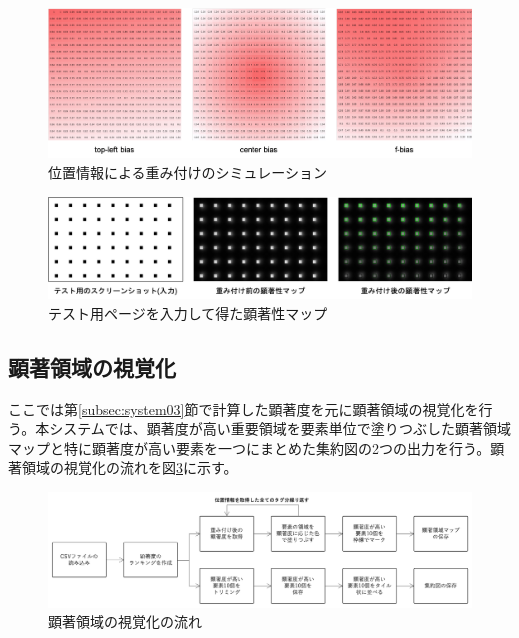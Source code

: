 \begin{figure}[H]
    \centering
    \includegraphics[width=12cm]{figures/fbias.png}
    \caption{位置情報による重み付けのシミュレーション}
    \label{fig_fbias}
\end{figure}

\begin{figure}[H]
    \centering
    \includegraphics[width=12cm]{figures/fbias-test.png}
    \caption{テスト用ページを入力して得た顕著性マップ}
    \label{fig_fbias-test}
\end{figure}


\subsection{顕著領域の視覚化}\label{subsec:system04}
\par ここでは第\ref{subsec:system03}節で計算した顕著度を元に顕著領域の視覚化を行う。本システムでは、顕著度が高い重要領域を要素単位で塗りつぶした顕著領域マップと特に顕著度が高い要素を一つにまとめた集約図の2つの出力を行う。顕著領域の視覚化の流れを図\ref{fig_system04}に示す。

\begin{figure}[H]
    \centering
    \includegraphics[width=12cm]{figures/system04.png}
    \caption{顕著領域の視覚化の流れ}
    \label{fig_system04}
\end{figure}

